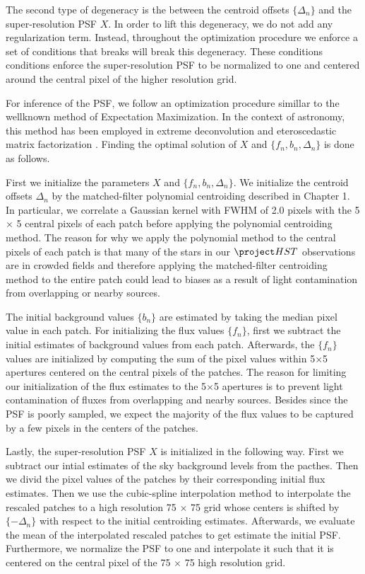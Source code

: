 The second type of degeneracy is the between the centroid offsets $\{\Delta_n\}$ and the super-resolution PSF $X$. In order to lift this degeneracy, we do not add any regularization 
term. Instead, throughout the optimization procedure we enforce a set of conditions that breaks will break this degeneracy. These conditions conditions enforce the super-resolution 
PSF to be normalized to one and centered around the central pixel of the higher resolution grid. 

For inference of the PSF, we follow an optimization procedure simillar to the wellknown method of Expectation Maximization. In the context of astronomy, this 
method has been employed in extreme deconvolution \citep{xd} and eteroscedastic matrix factorization \citep{hmf}. Finding the optimal solution of 
$X$ and $\{f_n , b_n , \Delta_n\}$ is done as follows. 

First we initialize the parameters $X$ and $\{f_n , b_n , \Delta_n\}$. We initialize the centroid offsets ${\Delta_n}$ by the matched-filter polynomial centroiding 
described in Chapter 1. In particular, we correlate a Gaussian kernel with FWHM of 2.0 pixels with the 5 $\times$ 5 central pixels of each patch before applying 
the polynomial centroiding method. The reason for why we apply the polynomial method to the central pixels of each patch is that many of the stars in our $\hst$ observations 
are in crowded fields and therefore applying the matched-filter centroiding method to the entire patch could lead to biases as a result of light contamination from overlapping 
or nearby sources. 

The initial background values $\{b_n\}$ are estimated by taking the median pixel value in each patch. For initializing the flux values $\{f_n\}$, first we subtract the initial 
estimates of background values from each patch. Afterwards, the $\{f_n\}$ values are initialized by computing the sum of the pixel values within 5$\times$5 apertures centered on 
the central pixels of the patches. The reason for limiting our initialization of the flux estimates to the 5$\times$5 apertures is to prevent light contamination of fluxes from 
overlapping and nearby sources. Besides since the PSF is poorly sampled, we expect the majority of the flux values to be captured by a few pixels in the centers of the patches. 

Lastly, the super-resolution PSF $X$ is initialized in the following way. First we subtract our intial estimates of the sky background levels from the pacthes. Then we divid the 
pixel values of the patches by their corresponding initial flux estimates. Then we use the cubic-spline interpolation method to interpolate the rescaled patches to a high resolution 
75 $\times$ 75 grid whose centers is shifted by $\{-\Delta_n\}$ with respect to the initial centroiding estimates. Afterwards, we evaluate the mean of the interpolated rescaled patches 
to get estimate the initial PSF. Furthermore, we normalize the PSF to one and interpolate it such that it is centered on the central pixel of the 75 $\times$ 75 high resolution grid.  

